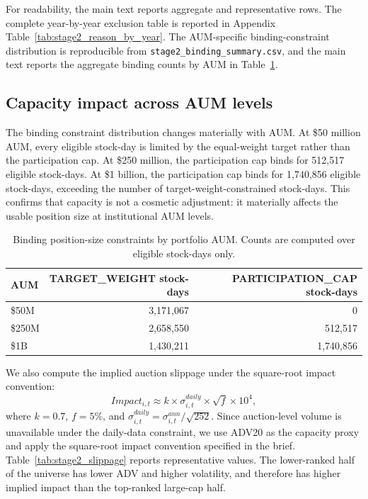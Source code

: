 \documentclass[12pt]{article}
\begin{document}
For readability, the main text reports aggregate and representative rows. The complete year-by-year exclusion table is reported in Appendix Table~\ref{tab:stage2_reason_by_year}. The AUM-specific binding-constraint distribution is reproducible from \texttt{stage2\_binding\_summary.csv}, and the main text reports the aggregate binding counts by AUM in Table~\ref{tab:stage2_binding}.

\subsection{Capacity impact across AUM levels}

The binding constraint distribution changes materially with AUM. At \$50 million AUM, every eligible stock-day is limited by the equal-weight target rather than the participation cap. At \$250 million, the participation cap binds for 512,517 eligible stock-days. At \$1 billion, the participation cap binds for 1,740,856 eligible stock-days, exceeding the number of target-weight-constrained stock-days. This confirms that capacity is not a cosmetic adjustment: it materially affects the usable position size at institutional AUM levels.

\begin{table}[htbp]
\centering
\small
\begin{tabular}{lrr}
\hline
AUM & TARGET\_WEIGHT stock-days & PARTICIPATION\_CAP stock-days \\
\hline
\$50M & 3,171,067 & 0 \\
\$250M & 2,658,550 & 512,517 \\
\$1B & 1,430,211 & 1,740,856 \\
\hline
\end{tabular}
\caption{Binding position-size constraints by portfolio AUM. Counts are computed over eligible stock-days only.}
\label{tab:stage2_binding}
\end{table}

We also compute the implied auction slippage under the square-root impact convention:
\[
Impact_{i,t}
\approx
k \times \sigma^{daily}_{i,t} \times \sqrt{f} \times 10^4,
\]
where $k=0.7$, $f=5\%$, and $\sigma^{daily}_{i,t}=\sigma^{ann}_{i,t}/\sqrt{252}$. Since auction-level volume is unavailable under the daily-data constraint, we use ADV20 as the capacity proxy and apply the square-root impact convention specified in the brief. Table~\ref{tab:stage2_slippage} reports representative values. The lower-ranked half of the universe has lower ADV and higher volatility, and therefore has higher implied impact than the top-ranked large-cap half.
\end{document}
